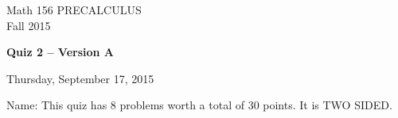 \documentclass[11pt]{article}
\begin{document}
\begin{center}
\vspace{2in}

\huge{Math 156 PRECALCULUS \\
Fall 2015}

\vfill

\huge{\bf{Quiz 2 -- Version A}}\\

\vspace{0.5in}

\large{Thursday, September 17, 2015}\\

\vfill


{\huge{Name:{\underline{\hspace{2in}}}}}
\vfill
This quiz has 8 problems worth a total of 30 points. It is TWO SIDED. 
\vfill
\end{center}
\newpage
\restoregeometry
\end{document}
